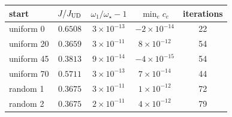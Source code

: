 \begin{tabular}{@{}lcccc@{}}
\toprule
start & $J/J_{\mathrm{UD}}$ & $\omega_1/\omega_\star-1$ & $\min_e c_e$ & iterations\\
\midrule
uniform 0 & $0.6508$ & $3\times10^{-13}$ & $-2\times10^{-14}$ & 22\\
uniform 20 & $0.3659$ & $3\times10^{-11}$ & $8\times10^{-12}$ & 54\\
uniform 45 & $0.3813$ & $9\times10^{-14}$ & $-4\times10^{-15}$ & 54\\
uniform 70 & $0.5711$ & $3\times10^{-13}$ & $7\times10^{-14}$ & 44\\
random 1 & $0.3675$ & $3\times10^{-11}$ & $1\times10^{-12}$ & 72\\
random 2 & $0.3675$ & $2\times10^{-11}$ & $4\times10^{-12}$ & 79\\
\bottomrule
\end{tabular}
